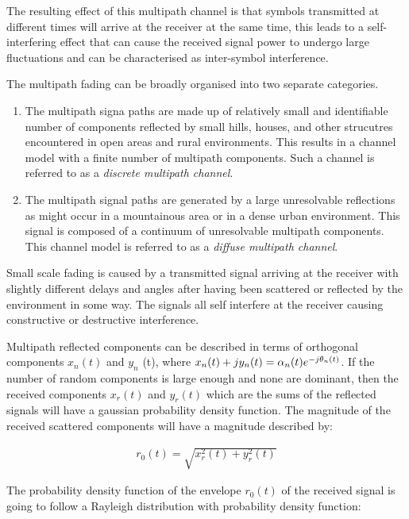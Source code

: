 The resulting effect of this multipath channel is that %
symbols transmitted at different times will arrive %
at the receiver at the same time, this leads to %
a self-interfering effect that can cause the received %
signal power to undergo large fluctuations and can %
be characterised as inter-symbol interference.

The multipath fading can be broadly organised into %
two separate categories\cite{Jer00}.

\begin{enumerate}
	\item{The multipath signa paths are made up %
		of relatively small and identifiable number %
		of components reflected by small hills, %
		houses, and other strucutres encountered in %
		open areas and rural environments. This %
		results in a channel model with a finite number %
		of multipath components. Such a channel is %
		referred to as a \emph{discrete multipath channel}.}
	\item{The multipath signal paths are generated by %
		a large unresolvable reflections as might occur %
		in a mountainous area or in a dense urban environment. %
		This signal is composed of a continuum of %
		unresolvable multipath components. This %
		channel model is referred to as a \emph{diffuse %
		multipath channel}.}
\end{enumerate}

Small scale fading is caused by a transmitted signal %
arriving at the receiver with slightly different delays %
and angles after having been scattered or reflected by %
the environment in some way. The signals all self %
interfere at the receiver causing constructive or %
destructive interference. 

Multipath reflected components can be described in %
terms of orthogonal components $x_{n}(t)$ and %
$y_{n}$%
(t), where $x_{n}(t) + jy_{n}(t) = \alpha_{n}(t)e^{%
-j\theta_{n}(t)}$. If the number of random components %
is large enough and none are dominant, then the received %
components $x_{r}(t)$ and $y_{r}(t)$ which are the sums %
of the reflected signals will have a gaussian probability %
density function. The magnitude of the received scattered %
components will have a magnitude described by:

\begin{align}
	r_{0}(t) = \sqrt{x_{r}^{2}(t) + y_{r}^{2}(t)}
\end{align}

The probability density function of the envelope $r_{0}(t)$ %
of the received signal is going to follow a Rayleigh distribution %
with probability density function:

